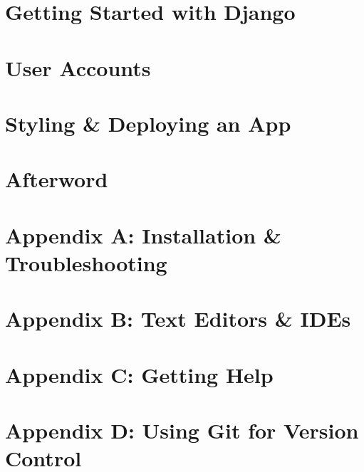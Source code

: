 \documentclass[oneside]{book}
\numberwithin{equation}{section}
\begin{document}
\section{Getting Started with Django}


\section{User Accounts}


\section{Styling \& Deploying an App}


\section*{Afterword}


\section{Appendix A: Installation \& Troubleshooting}


\section{Appendix B: Text Editors \& IDEs}


\section{Appendix C: Getting Help}


\section{Appendix D: Using Git for Version Control}



\printbibliography[heading=bibintoc]
	
\end{document}
